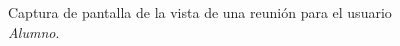   \begin{figure}[!ht]
    \begin{center}
      \caption{Captura de pantalla de la vista de una reunión para el usuario \textit{Alumno}.}
      \label{capturaPantallaVerReunion}
    \end{center}
  \end{figure}

